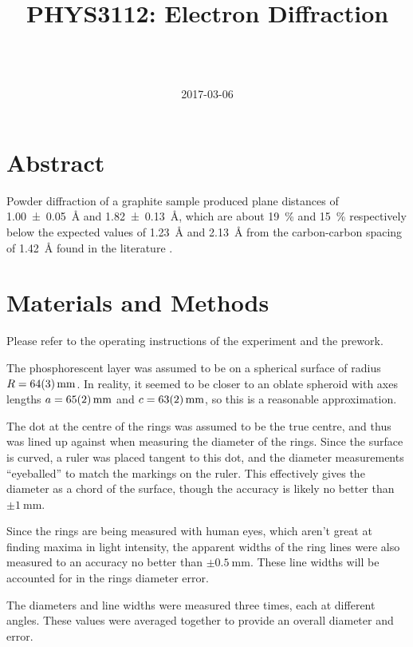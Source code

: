 \documentclass[a4paper]{scrartcl}
\begin{document}
\title{PHYS3112: Electron Diffraction}
\author{ \\ \\ }
\date{2017-03-06}
\maketitle

\section{Abstract}
Powder diffraction of a graphite sample produced plane distances of \SI{1.00 \pm 0.05}{\angstrom} and \SI{1.82 \pm 0.13}{\angstrom}, which are about \SI{19}{\percent} and \SI{15}{\percent} respectively below the expected values of \SI{1.23}{\angstrom} and \SI{2.13}{\angstrom} from the carbon-carbon spacing of \SI{1.42}{\angstrom} found in the literature \cite{DEL2001}.

\section{Materials and Methods}
Please refer to the operating instructions of the experiment and the prework.

The phosphorescent layer was assumed to be on a spherical surface of radius \(R = \SI{64 \pm 3}{\milli\metre}\). In reality, it seemed to be closer to an oblate spheroid with axes lengths \(a = \SI{65 \pm 2}{\milli\metre}\) and \(c = \SI{63 \pm 2}{\milli\metre}\), so this is a reasonable approximation.

The dot at the centre of the rings was assumed to be the true centre, and thus was lined up against when measuring the diameter of the rings. Since the surface is curved, a ruler was placed tangent to this dot, and the diameter measurements ``eyeballed'' to match the markings on the ruler. This effectively gives the diameter as a chord of the surface, though the accuracy is likely no better than \(\pm\SI{1}{\milli\metre}\).

Since the rings are being measured with human eyes, which aren't great at finding maxima in light intensity, the apparent widths of the ring lines were also measured to an accuracy no better than \(\pm\SI{0.5}{\milli\metre}\). These line widths will be accounted for in the rings diameter error.

The diameters and line widths were measured three times, each at different angles. These values were averaged together to provide an overall diameter and error.
\end{document}
